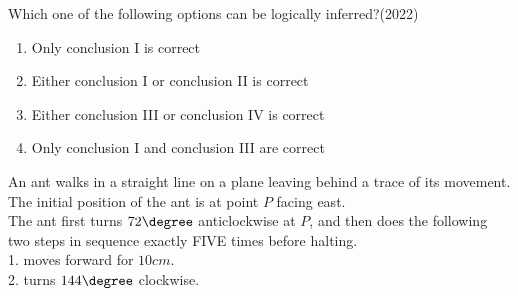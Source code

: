 Which one of the following options can be logically inferred?\hfill(2022)
\begin{enumerate}
\item Only conclusion \textsc{I} is correct
\item Either conclusion \textsc{I} or conclusion \textsc{II} is correct
\item Either conclusion \textsc{III} or conclusion \textsc{IV} is correct
\item Only conclusion \textsc{I} and conclusion \textsc{III} are correct 
\end{enumerate}


\item An ant walks in a straight line on a plane leaving behind a trace of its
movement. The initial position of the ant is at point $P$ facing east.\\

The ant first turns $72\degree$ anticlockwise at $P$, and then does the following two
steps in sequence exactly FIVE times before halting.\\

1. moves forward for $10cm$.\\
2. turns $144\degree$ clockwise.\\


